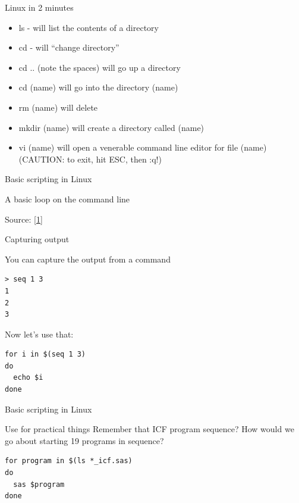 \documentclass[xcolor=table,compress]{beamer}
\begin{document}
\begin{frame}[frame]{Linux in 2 minutes}
\begin{itemize}
\item ls - will list the contents of a directory
\item cd - will ``change directory''
\item cd .. (note the spaces) will go up a directory
\item cd (name) will go into the directory (name)
\item rm (name) will delete
\item mkdir (name) will create a directory called (name)
\item vi (name) will open a venerable command line editor for file (name) \pause (CAUTION: to exit, hit ESC, then :q!)
\end{itemize}
\end{frame}


\begin{frame}[fragile]{Basic scripting in Linux}
\begin{block}{A basic loop on the command line}
\lstset{numbers=left, stepnumber=1, frame=single, language=bash}

\end{block}
\tiny{Source: \href{http://www.cyberciti.biz/faq/bash-for-loop/}{[1]}}
\end{frame}

\begin{frame}[fragile]{Capturing output}
\begin{block}{You can capture the output from a command}
\begin{lstlisting}
> seq 1 3
1
2
3
\end{lstlisting}
Now let's use that:
\begin{lstlisting}
for i in $(seq 1 3)
do
  echo $i
done
\end{lstlisting}
\end{block}
\end{frame}


\begin{frame}[fragile]{Basic scripting in Linux}
\begin{block}{Use for practical things}
Remember that ICF program sequence? How would we go about starting 19 programs in sequence?
\begin{lstlisting}
for program in $(ls *_icf.sas)
do
  sas $program
done
\end{lstlisting}
\end{block}
\end{frame}
\end{document}
